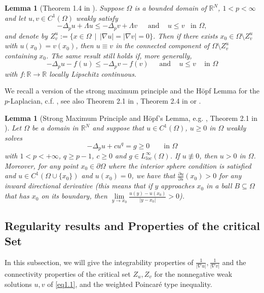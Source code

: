 \documentclass[12pt]{amsart}
\newtheorem{lem}[thm]{Lemma}
\theoremstyle{definition}
\theoremstyle{remark}
\theoremstyle{conclusion}
\theoremstyle{conjecture}
\numberwithin{equation}{section}
\newcommand{\R}{\mathbb{R}}
\begin{document}
\begin{lem}[Theorem 1.4 in \cite{LD}]\label{th3.2}
Suppose $\Omega$ is a bounded domain of $\R^N$, $1<p<\infty$ and let $u,v \in C^1(\Omega)$ weakly satisfy
$$ -\Delta_p u + \Lambda u \leq  -\Delta_p v + \Lambda v \quad\,\,\,\mbox{and}\quad\,u\leq v\,\,\,\,\,\mbox{in}\,\,\Omega,$$
and denote by $Z_v^u:=\{ x\in\Omega\,\mid\,|\nabla u|=|\nabla v| =0 \}$. Then if there exists $x_0\in\Omega\setminus Z_v^u$ with $u(x_0)=v(x_0)$, then $u\equiv v$ in the connected component of $\Omega\setminus Z_v^u$ containing $x_0$. The same result still holds if, more generally,
$$ -\Delta_p u - f(u) \leq  -\Delta_p v - f(v) \quad\,\,\,\mbox{and}\,\quad u\leq v \quad\,\mbox{in}\,\,\Omega$$
with $f:\R \to \R$ locally Lipschitz continuous.
\end{lem}

We recall a version of the strong maximum principle and the H\"{o}pf Lemma for the $p$-Laplacian, c.f. \cite{JLV}, see also Theorem 2.1 in \cite{LDBS04}, Theorem 2.4 in \cite{LDSMLMSB} or \cite{LD,PS}.
\begin{lem}[Strong Maximum Principle and H\"{o}pf's Lemma, e.g. \cite{JLV}, Theorem 2.1 in \cite{LDBS04}]\label{hopf}
Let $\Omega$ be a domain in $\mathbb{R}^{N}$ and suppose that $u\in C^{1}(\Omega)$, $u\geq0$ in $\Omega$ weakly solves
\[-\Delta_{p}u+cu^{q}=g\geq0 \qquad \text{in} \,\,\Omega\]
with $1<p<+\infty$, $q\geq p-1$, $c\geq0$ and $g\in L^{\infty}_{loc}(\Omega)$. If $u\not\equiv0$, then $u>0$ in $\Omega$. Moreover, for any point $x_{0}\in\partial\Omega$ where the interior sphere condition is satisfied and $u\in C^{1}(\Omega\cup\{x_{0}\})$ and $u(x_{0})=0$, we have that $\frac{\partial u}{\partial s}(x_{0})>0$ for any inward directional derivative (this means that if $y$ approaches $x_{0}$ in a ball $B\subseteq\Omega$ that has $x_{0}$ on its boundary, then $\lim\limits_{y\rightarrow x_{0}}\frac{u(y)-u(x_{0})}{|y-x_{0}|}>0$).
\end{lem}


\subsection{Regularity results and Properties of the critical Set}\label{sc2.2}

In this subsection, we will give the integrability properties of $\frac{1}{|\nabla u|}, \frac{1}{|\nabla v|}$ and the connectivity properties of the critical set $Z_{u},Z_{v}$ for the nonnegative weak solutions $u,v$ of \eqref{eq1.1}, and the weighted Poincar\'{e} type inequality.
\end{document}
